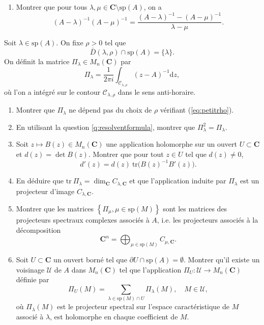 \documentclass[a4paper,12pt]{article}
\theoremstyle{plain}
\theoremstyle{definition}
\newcommand{\dd}{\mathrm{d}}
\newcommand{\tr}{\mathrm{tr}}
\newcommand{\C}{\mathbf{C}}
\renewcommand{\sp}{\mathrm{sp}}
\newcommand{\CC}{\mathscr{C}}
\begin{document}
\begin{enumerate}[label=\textbf{\arabic*.}]
\item\label{q:resolventformula} Montrer que pour tous $\lambda, \mu \in \C\setminus \sp(A)$, on a 
$$
(A-\lambda)^{-1}(A-\mu)^{-1} = \frac{(A-\lambda)^{-1} - (A-\mu)^{-1}}{\lambda - \mu}.
$$
\end{enumerate}
Soit $\lambda \in \sp(A)$. On fixe $\rho > 0$ tel que
\begin{equation}\label{eq:petitrho}
\bar{D}(\lambda, \rho) \cap \sp(A) = \{\lambda\}.
\end{equation}
 On d\'efinit la matrice $\Pi_\lambda \in M_n(\C)$ par
$$
\Pi_\lambda = \frac{1}{2\pi i} \int_{\CC_{\lambda,\rho}} (z-A)^{-1} \dd z,
$$
o\`u l'on a int\'egr\'e sur le contour $\CC_{\lambda, \rho}$ dans le sens anti-horaire.
\begin{enumerate}[resume, label=\textbf{\arabic*.}]
\item Montrer que $\Pi_\lambda$ ne d\'epend pas du choix de $\rho$ v\'erifiant (\ref{eq:petitrho}).

\item En utilisant la question \ref{q:resolventformula}, montrer que $\Pi_\lambda^2 = \Pi_\lambda$.

\item Soit $z \mapsto B(z) \in M_n(\C)$ une application holomorphe sur un ouvert $U \subset \C$ et $d(z) = \det B(z)$.  Montrer que pour tout $z \in U$ tel que $d(z) \neq 0$,
$$
d'(z) = d(z) ~ \tr\bigl(B(z)^{-1} B'(z)\bigr).
$$
\item En d\'eduire que $\tr ~\Pi_\lambda = \dim_\C C_{\lambda,\C}$ et que l'application induite par $\Pi_\lambda$ est un projecteur d'image $C_{\lambda,\C}$.

\item Montrer que les matrices $\left\{\Pi_\mu, \mu \in \sp(M)\right\}$  sont les matrices des projecteurs spectraux complexes associ\'es \`a $A$, i.e. les projecteurs associ\'es \`a la d\'ecomposition
$$
\C^n = \bigoplus_{\mu \in \sp(M)} C_{\mu,\C}.
$$

\item Soit $U \subset \C$ un ouvert born\'e tel que $\partial U \cap \sp(A) = \emptyset$. Montrer qu'il existe un voisinage $\mathcal{U}$ de $A$ dans $M_n(\C)$ tel que l'application $\Pi_U : \mathcal{U} \to M_n(\C)$ d\'efinie par
$$
\Pi_U(M) = \sum_{\lambda \in \sp(M) \cap U} \Pi_{\lambda}(M), \quad M \in \mathcal{U},
$$
o\`u $\Pi_\lambda(M)$ est le projecteur spectral sur l'espace caract\'eristique de $M$ associ\'e \`a $\lambda$, est holomorphe en chaque coefficient de $M$.

\end{enumerate}
\end{document}
